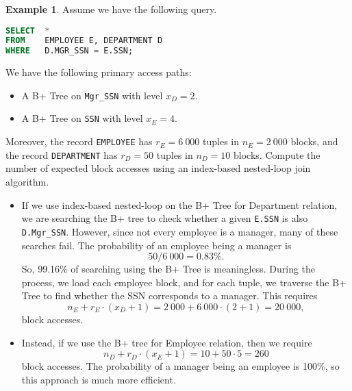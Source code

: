 \documentclass[a4paper, openany]{memoir}
\theoremstyle{definition}
\newtheorem{example}[subsection]{Example}
\begin{document}
\begin{example}
    Assume we have the following query.
\begin{lstlisting}[language=SQL]
SELECT  *
FROM    EMPLOYEE E, DEPARTMENT D
WHERE   D.MGR_SSN = E.SSN;
\end{lstlisting}
We have the following primary access paths:
\begin{itemize}
    \item A B+ Tree on \texttt{Mgr\_SSN} with level $x_D = 2$.
    \item A B+ Tree on \texttt{SSN} with level $x_E = 4$.
\end{itemize}
Moreover, the record \texttt{EMPLOYEE} has $r_E = 6 \ 000$ tuples in $n_E = 2 \ 000$ blocks, and the record \texttt{DEPARTMENT} has $r_D = 50$ tuples in $n_D = 10$ blocks. Compute the number of expected block accesses using an index-based nested-loop join algorithm.
\end{example}
\begin{answer}
    \begin{itemize}
        \item If we use index-based nested-loop on the B+ Tree for Department relation, we are searching the B+ tree to check whether a given \texttt{E.SSN} is also \texttt{D.Mgr\_SSN}. However, since not every employee is a manager, many of these searches fail. The probability of an employee being a manager is 
        \[50/ 6 \ 000 = 0.83\%.\]
        So, 99.16\% of searching using the B+ Tree is meaningless. During the process, we load each employee block, and for each tuple, we traverse the B+ Tree to find whether the SSN corresponds to a manager. This requires
        \[n_E + r_E \cdot (x_D + 1) = 2 \ 000 + 6 \ 000 \cdot (2 + 1) = 20 \ 000,\]
        block accesses. 
        
        \item Instead, if we use the B+ tree for Employee relation, then we require
        \[n_D + r_D \cdot (x_E + 1) = 10 + 50 \cdot 5 = 260\]
        block accesses. The probability of a manager being an employee is 100\%, so this approach is much more efficient.
    \end{itemize}
\end{answer}
\end{document}
